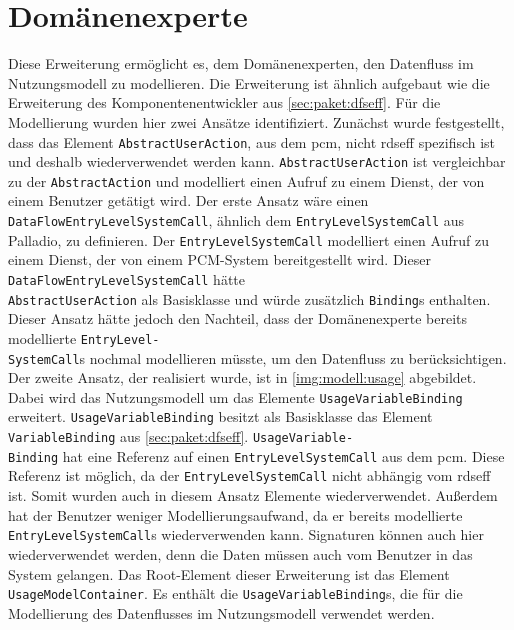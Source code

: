 \section{Domänenexperte}
\label{sec:paket:usage}
Diese Erweiterung ermöglicht es, dem Domänenexperten, den Datenfluss im Nutzungsmodell zu modellieren. Die Erweiterung ist ähnlich aufgebaut wie die Erweiterung des Komponentenentwickler aus \autoref{sec:paket:dfseff}. Für die Modellierung wurden hier zwei Ansätze identifiziert. Zunächst wurde festgestellt, dass das Element \texttt{AbstractUserAction}, aus dem \gls{pcm}, nicht \gls{rdseff} spezifisch ist und deshalb wiederverwendet werden kann. \texttt{AbstractUserAction} ist vergleichbar zu der \texttt{AbstractAction} und modelliert einen Aufruf zu einem Dienst, der von einem Benutzer getätigt wird. Der erste Ansatz wäre einen \texttt{DataFlowEntryLevelSystemCall}, ähnlich dem \texttt{EntryLevelSystemCall} aus Palladio, zu definieren. Der \texttt{EntryLevelSystemCall} modelliert einen Aufruf zu einem Dienst, der von einem PCM-System bereitgestellt wird. Dieser \texttt{DataFlowEntryLevelSystemCall} hätte \\ \texttt{AbstractUserAction} als Basisklasse und würde zusätzlich \texttt{Binding}s enthalten. Dieser Ansatz hätte jedoch den Nachteil, dass der Domänenexperte bereits modellierte \texttt{EntryLevel-\\SystemCall}s nochmal modellieren müsste, um den Datenfluss zu berücksichtigen. Der zweite Ansatz, der realisiert wurde, ist in \autoref{img:modell:usage} abgebildet. Dabei wird das Nutzungsmodell um das Elemente \texttt{UsageVariableBinding} erweitert. \texttt{UsageVariableBinding} besitzt als Basisklasse das Element \texttt{VariableBinding} aus \autoref{sec:paket:dfseff}. \texttt{UsageVariable-\\Binding} hat eine Referenz auf einen \texttt{EntryLevelSystemCall} aus dem \gls{pcm}. Diese Referenz ist möglich, da der \texttt{EntryLevelSystemCall} nicht abhängig vom \gls{rdseff} ist. Somit wurden auch in diesem Ansatz  Elemente wiederverwendet. Außerdem hat der Benutzer weniger Modellierungsaufwand, da er bereits modellierte \texttt{EntryLevelSystemCall}s wiederverwenden kann. Signaturen können auch hier wiederverwendet werden, denn die Daten müssen auch vom Benutzer in das System gelangen. Das Root-Element dieser Erweiterung ist das Element \texttt{UsageModelContainer}. Es enthält die \texttt{UsageVariableBinding}s, die für die Modellierung des Datenflusses im Nutzungsmodell verwendet werden. \par
